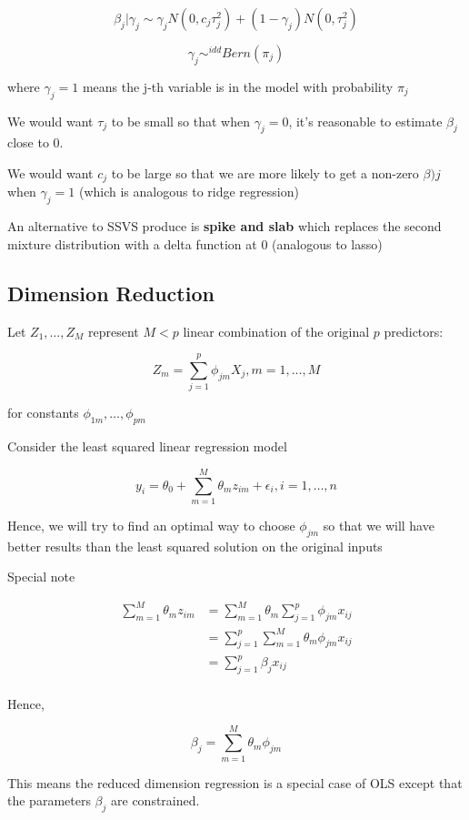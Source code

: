 \documentclass[
]{book}
\begin{document}
\[
\beta_j |\gamma_j \sim \gamma_j N(0, c_j \tau^2_j) + (1- \gamma_j)N(0, \tau^2_j)
\]

\[
\gamma_j \sim^{idd}Bern(\pi_j)
\]

where \(\gamma_j=1\) means the j-th variable is in the model with probability \(\pi_j\)

We would want \(\tau_j\) to be small so that when \(\gamma_j =0\), it's reasonable to estimate \(\beta_j\) close to 0.

We would want \(c_j\) to be large so that we are more likely to get a non-zero \(\beta)j\) when \(\gamma_j = 1\) (which is analogous to ridge regression)

An alternative to SSVS produce is \textbf{spike and slab} which replaces the second mixture distribution with a delta function at 0 (analogous to lasso)

\hypertarget{dimension-reduction}{%
\subsection{Dimension Reduction}\label{dimension-reduction}}

Let \(Z_1, \dots, Z_M\) represent \(M<p\) linear combination of the original \(p\) predictors:

\[
Z_m = \sum_{j=1}^p \phi_{jm} X_j, m = 1,\dots, M
\]

for constants \(\phi_{1m}, \dots, \phi_{pm}\)

Consider the least squared linear regression model

\[
y_i = \theta_0 + \sum_{m=1}^M \theta_m z_{im} + \epsilon_i, i = 1, \dots,n
\]

Hence, we will try to find an optimal way to choose \(\phi_{jm}\) so that we will have better results than the least squared solution on the original inputs

Special note

\[
\begin{aligned}
\sum_{m=1}^M \theta_m z_{im} &= \sum_{m=1}^M \theta_m \sum_{j=1}^p \phi_{jm} x_{ij} \\
&= \sum_{j=1}^p  \sum_{m=1}^M \theta_m \phi_{jm} x_{ij} \\
&= \sum_{j=1}^p \beta_j x_{ij} \\
\end{aligned}
\]

Hence,

\[
\beta_j = \sum_{m=1}^M \theta_m \phi_{jm}
\]

This means the reduced dimension regression is a special case of OLS except that the parameters \(\beta_j\) are constrained.
\end{document}
